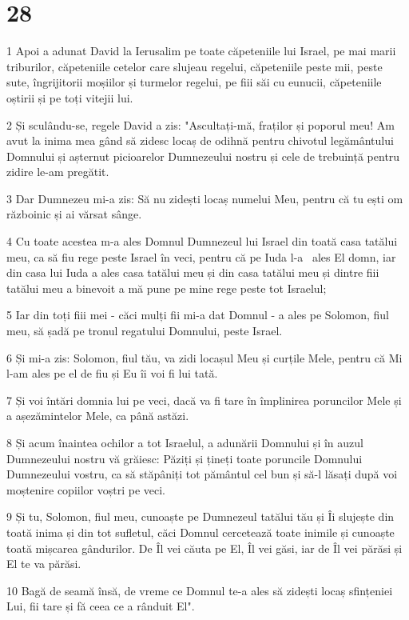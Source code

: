 \chapter{28}

\par 1 Apoi a adunat David la Ierusalim pe toate căpeteniile lui Israel, pe mai marii triburilor, căpeteniile cetelor care slujeau regelui, căpeteniile peste mii, peste sute, îngrijitorii moșiilor și turmelor regelui, pe fiii săi cu eunucii, căpeteniile oștirii și pe toți vitejii lui.
\par 2 Și sculându-se, regele David a zis: "Ascultați-mă, fraților și poporul meu! Am avut la inima mea gând să zidesc locaș de odihnă pentru chivotul legământului Domnului și așternut picioarelor Dumnezeului nostru și cele de trebuință pentru zidire le-am pregătit.
\par 3 Dar Dumnezeu mi-a zis: Să nu zidești locaș numelui Meu, pentru că tu ești om războinic și ai vărsat sânge.
\par 4 Cu toate acestea m-a ales Domnul Dumnezeul lui Israel din toată casa tatălui meu, ca să fiu rege peste Israel în veci, pentru că pe Iuda l-a  ales El domn, iar din casa lui Iuda a ales casa tatălui meu și din casa tatălui meu și dintre fiii tatălui meu a binevoit a mă pune pe mine rege peste tot Israelul;
\par 5 Iar din toți fiii mei - căci mulți fii mi-a dat Domnul - a ales pe Solomon, fiul meu, să șadă pe tronul regatului Domnului, peste Israel.
\par 6 Și mi-a zis: Solomon, fiul tău, va zidi locașul Meu și curțile Mele, pentru că Mi l-am ales pe el de fiu și Eu îi voi fi lui tată.
\par 7 Și voi întări domnia lui pe veci, dacă va fi tare în împlinirea poruncilor Mele și a așezămintelor Mele, ca până astăzi.
\par 8 Și acum înaintea ochilor a tot Israelul, a adunării Domnului și în auzul Dumnezeului nostru vă grăiesc: Păziți și țineți toate poruncile Domnului Dumnezeului vostru, ca să stăpâniți tot pământul cel bun și să-l lăsați după voi moștenire copiilor voștri pe veci.
\par 9 Și tu, Solomon, fiul meu, cunoaște pe Dumnezeul tatălui tău și Îi slujește din toată inima și din tot sufletul, căci Domnul cercetează toate inimile și cunoaște toată mișcarea gândurilor. De Îl vei căuta pe El, Îl vei găsi, iar de Îl vei părăsi și El te va părăsi.
\par 10 Bagă de seamă însă, de vreme ce Domnul te-a ales să zidești locaș sfințeniei Lui, fii tare și fă ceea ce a rânduit El".
